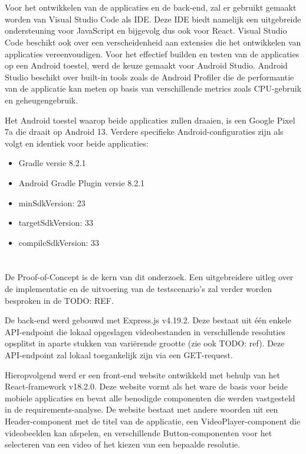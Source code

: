 \section{}%
\label{sec:omgeving-opzetten}

Voor het ontwikkelen van de applicaties en de back-end, zal er gebruikt gemaakt worden van Visual Studio Code als IDE. Deze IDE biedt namelijk een uitgebreide ondersteuning voor JavaScript en bijgevolg dus ook voor React. Visual Studio Code beschikt ook over een verscheidenheid aan extensies die het ontwikkelen van applicaties vereenvoudigen. Voor het effectief builden en testen van de applicaties op een Android toestel, werd de keuze gemaakt voor Android Studio. Android Studio beschikt over built-in tools zoals de Android Profiler die de performantie van de applicatie kan meten op basis van verschillende metrics zoals CPU-gebruik en geheugengebruik.

Het Android toestel waarop beide applicaties zullen draaien, is een Google Pixel 7a die draait op Android 13. Verdere specifieke Android-configuraties zijn als volgt en identiek voor beide applicaties:
\begin{itemize}
    \item Gradle versie 8.2.1
    \item Android Gradle Plugin versie 8.2.1
    \item minSdkVersion: 23
    \item targetSdkVersion: 33
    \item compileSdkVersion: 33
\end{itemize}


\section{}%
\label{sec:proof-of-concept}

De Proof-of-Concept is de kern van dit onderzoek. Een uitgebreidere uitleg over de implementatie en de uitvoering van de testscenario's zal verder worden besproken in de TODO: REF.

De back-end werd gebouwd met Express.js v4.19.2. Deze bestaat uit één enkele API-endpoint die lokaal opgeslagen videobestanden in verschillende resoluties opsplitst in aparte stukken van variërende grootte (zie ook TODO: ref). Deze API-endpoint zal lokaal toegankelijk zijn via een GET-request.

Hieropvolgend werd er een front-end website ontwikkeld met behulp van het React-framework v18.2.0. Deze website vormt als het ware de basis voor beide mobiele applicaties en bevat alle benodigde componenten die werden vastgesteld in de requirements-analyse. De website bestaat met andere woorden uit een Header-component met de titel van de applicatie, een VideoPlayer-component die videobeelden kan afspelen, en verschillende Button-componenten voor het selecteren van een video of het kiezen van een bepaalde resolutie.

